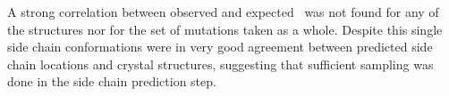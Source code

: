A strong correlation between observed and expected \ddg\ was not found for any of the structures nor for the set of mutations taken as a whole.
Despite this single side chain conformations were in very good agreement between predicted side chain locations and crystal structures, suggesting that sufficient sampling was done in the side chain prediction step.

